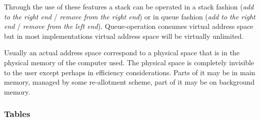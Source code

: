 \documentclass{article}
\newcommand\g[1]{{\sf #1}}
\gdef\mkbold{\catcode`\'\active\def'##1'{\char39\relax{\bt##1}\char39\relax}%
\catcode`\,\active\def,{\char44\relax}%
\catcode`\<\active\def<{\char60\relax}%
\catcode`\>\active\def>{\char62\relax}%
\catcode`\$=12\catcode`\#=12\catcode`\^=12%
\catcode`\ \active\def {\nobreakspace}}}
\newenvironment{program}{%
\ignorespaces
\par\vskip 5pt plus 2pt minus 2pt
\leftmargin=20pt
\parindent=0pt\tt
\catcode`\$=12\catcode`\^=12
\mkbold
\obeylines
\leftskip 8pt
\baselineskip=0.9\baselineskip
\everypar\expandafter{\the\everypar\unpenalty}%
}{\vskip 6pt plus 2pt minus 1pt}
{\catcode`\'=\active\catcode`\ =\active\catcode`\,=\active%
\catcode`\$=12\catcode`\^=12\catcode`\|=\active\catcode`\<\active\catcode`\>\active%
\gdef\pp#1{\relax\begingroup
\catcode`\$=12\catcode`\~=12\catcode`\^=12%
\catcode`\|\active\let|\endgroup
\catcode`\ \active\def {\space}%
\catcode`\'\active\def'##1'{\char39\relax{\bt##1}\char39\relax}%
\catcode`\<\active\def<{\char60\relax}%
\catcode`\>\active\def>{\char62\relax}%
\catcode`\#=12\catcode`\^=12%
\tt
}%
}
\begin{document}
Through the use of these features a stack can be operated in a stack
fashion (\emph{add to the right end} / \emph{remove from the right end}) 
or in queue fashion (\emph{add to the right end} / \emph{remove from
the left end}). Queue-operation consumes virtual
address space but in most implementations virtual address space will be
virtually unlimited.


Usually an actual address space correspond to a physical space that is in
the physical memory of the computer used. The physical space is completely
invisible to the user except perhaps in efficiency considerations. Parts of
it may be in main memory, managed by some re-allotment scheme, part of it
may be on background memory.

%

\subsubsection{Tables}\label{4.1.5}
\end{document}
